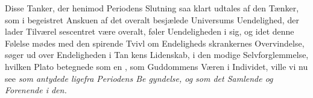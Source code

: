 Disse Tanker, der henimod Periodens Slutning saa klart
udtales af den Tænker, som i begeistret Anskuen af det
overalt besjælede Universums Uendelighed, der lader Tilværel\-%
sescentret være overalt, føler Uendeligheden i sig, og idet
denne Følelse mødes med den spirende Tvivl om Endeligheds\-%
skrankernes Overvindelse, søger ud over Endeligheden i Tan\-%
kens Lidenskab, i den modige Selvforglemmelse, hvilken Plato
betegnede som en , som Guddommens Væren i Individet,
ville vi nu see \emph{som antydede ligefra Periodens Be\-%
gyndelse, og som det Samlende og Forenende i den.}


